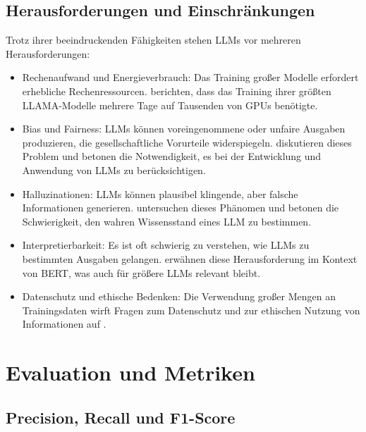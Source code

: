 \subsection{Herausforderungen und Einschränkungen}
\label{subsec:llm-challenges}

Trotz ihrer beeindruckenden Fähigkeiten stehen \glspl{LLM} vor mehreren Herausforderungen:

\begin{itemize}
	\item Rechenaufwand und Energieverbrauch: Das Training großer Modelle erfordert erhebliche Rechenressourcen. \textcite{TouvronHugo2023LOaE} berichten, dass das Training ihrer größten LLAMA-Modelle mehrere Tage auf Tausenden von GPUs benötigte.
	
	\item Bias und Fairness: \glspl{LLM} können voreingenommene oder unfaire Ausgaben produzieren, die gesellschaftliche Vorurteile widerspiegeln. \textcite{BrownTomB2020LMaF} diskutieren dieses Problem und betonen die Notwendigkeit, es bei der Entwicklung und Anwendung von \glspl{LLM} zu berücksichtigen.
	
	\item Halluzinationen: \glspl{LLM} können plausibel klingende, aber falsche Informationen generieren. \textcite{JiangZhengbao2020HCWK} untersuchen dieses Phänomen und betonen die Schwierigkeit, den wahren Wissensstand eines \gls{LLM} zu bestimmen.
	
	\item Interpretierbarkeit: Es ist oft schwierig zu verstehen, wie \glspl{LLM} zu bestimmten Ausgaben gelangen. \textcite{DevlinJacob2019BPoD} erwähnen diese Herausforderung im Kontext von BERT, was auch für größere \glspl{LLM} relevant bleibt.
	
	\item Datenschutz und ethische Bedenken: Die Verwendung großer Mengen an Trainingsdaten wirft Fragen zum Datenschutz und zur ethischen Nutzung von Informationen auf \cite{TouvronHugo2023LOaE}.
\end{itemize}

\section{Evaluation und Metriken}
\label{sec:evaluation-metrics}

\subsection{Precision, Recall und F1-Score}
\label{subsec:precision-recall-f1}

